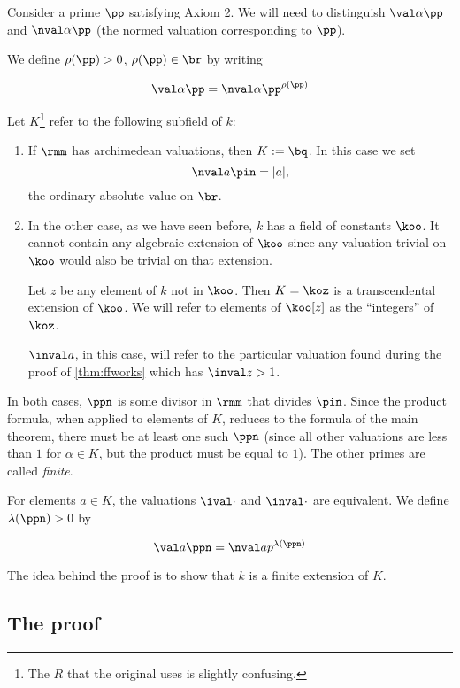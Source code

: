 Consider a prime $\pp$ satisfying Axiom 2. We will need to distinguish $\val
\alpha \pp$ and $\nval \alpha \pp$ (the normed valuation corresponding to
$\pp$).

We define $\rho(\pp) > 0$, $\rho(\pp) \in \br$ by writing

\[ \val \alpha \pp = \nval \alpha \pp ^{\rho(\pp)} \]

Let $K$\footnote{The $R$ that the original uses is slightly confusing.} refer to
the following subfield of $k$:

\begin{enumerate}
\item If $\rmm$ has archimedean valuations, then $K := \bq$. In this case we set
  \[ \nval a \pin = |a|, \]
  the ordinary absolute value on $\br$.

\item In the other case, as we have seen before, $k$ has a field of constants
  $\koo$. It cannot contain any algebraic extension of $\koo$ since any
  valuation trivial on $\koo$ would also be trivial on that extension.

  Let $z$ be any element of $k$ not in $\koo$. Then $K = \koz$ is a
  transcendental extension of $\koo$. We will refer to elements of $\koo[z]$ as
  the ``integers'' of $\koz$.

  $\inval a$, in this case, will refer to the particular valuation found during
  the proof of \ref{thm:ffworks} which has $\inval z > 1$.
\end{enumerate}

In both cases, $\ppn$ is some divisor in $\rmm$ that divides $\pin$. Since the
product formula, when applied to elements of $K$, reduces to the formula of the
main theorem, there must be at least one such $\ppn$ (since all
other valuations are less than $1$ for $\alpha\in K$, but the product must be
equal to $1$). The other primes are called \textit{finite}.

For elements $a\in K$, the valuations $\ival\cdot$ and $\inval\cdot$ are
equivalent. We define $\lambda(\ppn) > 0$ by

\[ \val a \ppn = \nval a p ^{\lambda(\ppn)} \]

The idea behind the proof is to show that $k$ is a finite extension of $K$.

\subsection{The proof}

